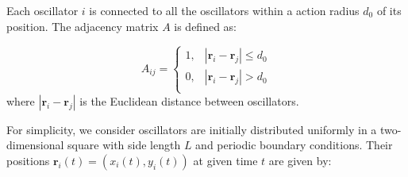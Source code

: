 \documentclass[%
 aip,
 amsmath,amssymb,
 reprint,%
]{revtex4-1}
\begin{document}
Each oscillator $i$ is connected to all the oscillators within a
action radius $d_0$ of its position. The adjacency matrix $A$ is defined as:

\begin{equation}
    A_{ij}=\begin{cases}
        1,&		\left| \mathbf{r}_i-\mathbf{r}_j \right|\le d_0\\
        0,&		\left| \mathbf{r}_i-\mathbf{r}_j \right|>d_0\\
    \end{cases}
\end{equation}
where $\left| \mathbf{r}_i-\mathbf{r}_j \right|$ is the Euclidean distance between oscillators. 

For simplicity, we consider oscillators are initially distributed uniformly in a two-dimensional square with side length $L$ and periodic boundary conditions. Their positions $\mathbf{r}_i\left( t \right) =\left( x_i\left( t \right) ,y_i\left( t \right) \right) $ at given time $t$ are given by:
\end{document}
